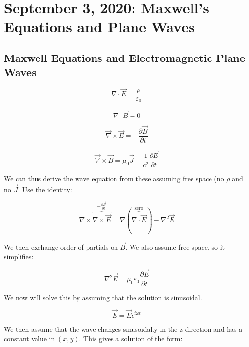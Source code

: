 \documentclass{article}
\begin{document}
\section{September 3, 2020: Maxwell's Equations and Plane Waves}

\subsection{Maxwell Equations and Electromagnetic Plane Waves}

\begin{equation}
    \nabla \cdot \vec{E} = \frac{\rho}{\varepsilon_0}
\end{equation}

\begin{equation}
    \nabla \cdot \vec{B} = 0
\end{equation}


\begin{equation}
    \vec{\nabla} \times \vec{E} = -\frac{\partial \vec{B}}{\partial t}
\end{equation}

\begin{equation}
    \vec{\nabla} \times \vec{B} = \mu_0 \vec{J} +\frac{1}{c^2}\frac{\partial \vec{E}}{\partial t}
\end{equation}

We can thus derive the wave equation from these assuming free space (no $\rho$ and no $\vec{J}$. Use the identity:

\begin{equation}
    \nabla \times \overbrace{\nabla \times \vec{E}}^{-\frac{\partial \vec{B}}{\partial t}} = \nabla(\overbrace{\nabla \cdot \vec{E}}^{\text{zero}}) - \nabla^{2} \vec{E}
\end{equation}

We then exchange order of partials on $\vec{B}$. We also assume free space, so it simplifies: 

\begin{equation}
    \boxed{\nabla^{2} \vec{E} = \mu_0 \varepsilon_0\frac{\partial \vec{E}}{\partial t}}
\end{equation}

We now will solve this by assuming that the solution is sinusoidal. 

\begin{equation}
    \vec{E} = \vec{E} e^{i \omega t}
\end{equation}

We then assume that the wave changes sinusoidally in the z direction and has a constant value in $(x,y)$. This gives a solution of the form:
\end{document}
